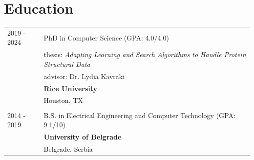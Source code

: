 \documentclass[a4paper,12pt]{article}
\begin{document}
\section{Education}
\begin{tabularx}{\linewidth}{@{}l X@{}}	

2019 - 2024 & PhD in Computer Science \hfill (GPA: 4.0/4.0) \\ 
& thesis: \textit{Adapting Learning and Search Algorithms to Handle Protein Structural Data} \\
& advisor: Dr. Lydia Kavraki \\
& \textbf{Rice University} \\
& Houston, TX \\
\\
2014 - 2019 & B.S. in Electrical Engineering and Computer Technology \hfill  (GPA: 9.1/10) \\
& \textbf{University of Belgrade} \\
& Belgrade, Serbia \\
\end{tabularx}
\end{document}

